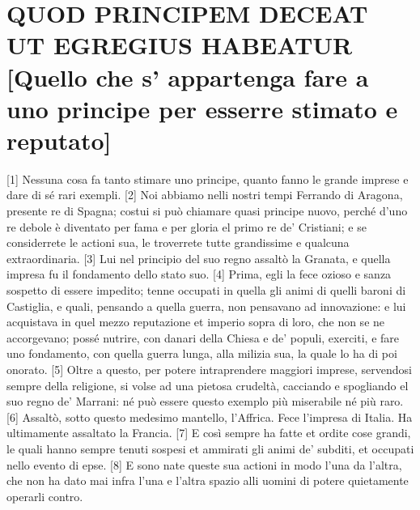 \quebra\section{QUOD PRINCIPEM DECEAT UT EGREGIUS HABEATUR
{[}Quello che s' appartenga fare a uno principe per esserre stimato e
reputato{]}}

{[}1{]} Nessuna cosa fa tanto stimare uno principe, quanto fanno le
grande imprese e dare di sé rari exempli. {[}2{]} Noi abbiamo nelli
nostri tempi Ferrando di Aragona, presente re di Spagna; costui si può
chiamare quasi principe nuovo, perché d'uno re debole è diventato per
fama e per gloria el primo re de' Cristiani; e se considerrete le
actioni sua, le troverrete tutte grandissime e qualcuna extraordinaria.
{[}3{]} Lui nel principio del suo regno assaltò la Granata, e quella
impresa fu il fondamento dello stato suo. {[}4{]} Prima, egli la fece
ozioso e sanza sospetto di essere impedito; tenne occupati in quella gli
animi di quelli baroni di Castiglia, e quali, pensando a quella guerra,
non pensavano ad innovazione: e lui acquistava in quel mezzo reputazione
et imperio sopra di loro, che non se ne accorgevano; possé nutrire, con
danari della Chiesa e de' populi, exerciti, e fare uno fondamento, con
quella guerra lunga, alla milizia sua, la quale lo ha di poi onorato.
{[}5{]} Oltre a questo, per potere intraprendere maggiori imprese,
servendosi sempre della religione, si volse ad una pietosa crudeltà,
cacciando e spogliando el suo regno de' Marrani: né può essere questo
exemplo più miserabile né più raro. {[}6{]} Assaltò, sotto questo
medesimo mantello, l'Affrica. Fece l'impresa di Italia. Ha ultimamente
assaltato la Francia. {[}7{]} E così sempre ha fatte et ordite cose
grandi, le quali hanno sempre tenuti sospesi et ammirati gli animi de'
subditi, et occupati nello evento di epse. {[}8{]} E sono nate queste
sua actioni in modo l'una da l'altra, che non ha dato mai infra l'una e
l'altra spazio alli uomini di potere quietamente operarli contro.

